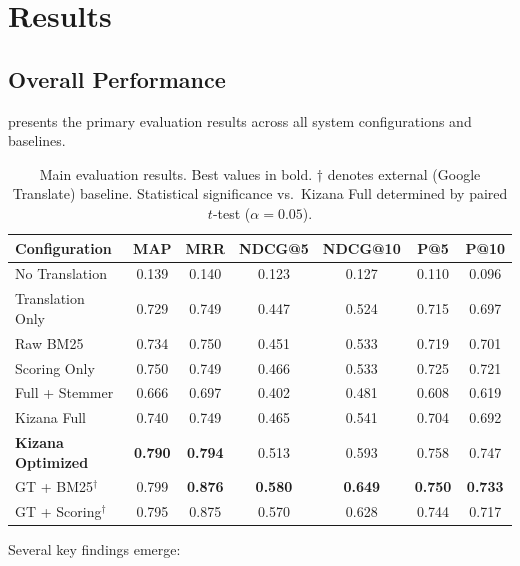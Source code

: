 \documentclass[preprint,12pt,numbers]{elsarticle}
\begin{document}
\section{Results}
\label{sec:results}

\subsection{Overall Performance}

 presents the primary evaluation results across all system configurations and baselines.

\begin{table}[t]
\centering
\caption{Main evaluation results. Best values in bold. $\dagger$ denotes external (Google Translate) baseline. Statistical significance vs.\ Kizana Full determined by paired $t$-test ($\alpha = 0.05$).}
\label{tab:main-results}
\begin{tabular}{lcccccc}
\toprule
Configuration & MAP & MRR & NDCG@5 & NDCG@10 & P@5 & P@10 \\
\midrule
No Translation & 0.139 & 0.140 & 0.123 & 0.127 & 0.110 & 0.096 \\
Translation Only & 0.729 & 0.749 & 0.447 & 0.524 & 0.715 & 0.697 \\
Raw BM25 & 0.734 & 0.750 & 0.451 & 0.533 & 0.719 & 0.701 \\
Scoring Only & 0.750 & 0.749 & 0.466 & 0.533 & 0.725 & 0.721 \\
Full + Stemmer & 0.666 & 0.697 & 0.402 & 0.481 & 0.608 & 0.619 \\
\midrule
Kizana Full & 0.740 & 0.749 & 0.465 & 0.541 & 0.704 & 0.692 \\
\textbf{Kizana Optimized} & \textbf{0.790} & \textbf{0.794} & 0.513 & 0.593 & 0.758 & 0.747 \\
\midrule
GT + BM25$^\dagger$ & 0.799 & \textbf{0.876} & \textbf{0.580} & \textbf{0.649} & \textbf{0.750} & \textbf{0.733} \\
GT + Scoring$^\dagger$ & 0.795 & 0.875 & 0.570 & 0.628 & 0.744 & 0.717 \\
\bottomrule
\end{tabular}
\end{table}

Several key findings emerge:
\end{document}
